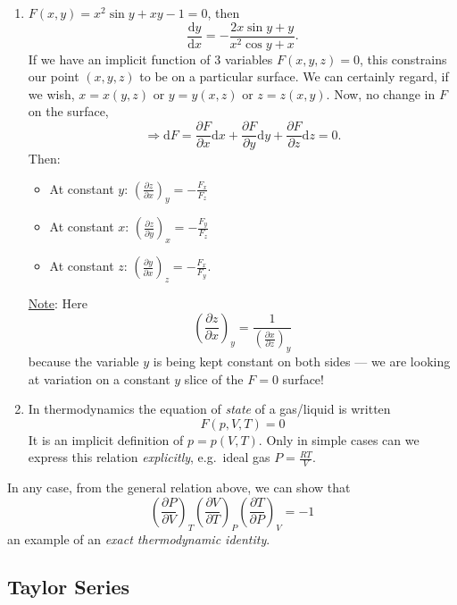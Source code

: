 \documentclass[12pt]{report}
\theoremstyle{definition}
\begin{document}
\begin{enumerate}[label = (\roman*)]
    \item $F(x,y) = x^{2}\sin{y} + xy - 1 = 0$, then\[
            \frac{\mathrm{d}y}{\mathrm{d}x} = -\frac{2x\sin{y}+y}{x^{2}\cos{y}+x}.
    \]
    If we have an implicit function of 3 variables $F(x,y,z) = 0$, 
    this constrains our point $(x,y,z)$ to be on a particular surface.
    We can certainly regard, if we wish, $x= x(y,z)$ or $y = y(x,z)$ or $z = z(x,y)$.
    Now, no change in $F$ on the surface,\[
        \Rightarrow{}\mathrm{d}F = \frac{\partial F}{\partial x} \mathrm{d}x
        + \frac{\partial F}{\partial y} \mathrm{d}y + \frac{\partial F}{\partial z} \mathrm{d}z = 0.
    \]
    Then:
    \begin{itemize}
        \item At constant $y$: ${\left(\frac{\partial z}{\partial x} \right)}_{y}=-\frac{F_x}{F_z}$
        \item At constant $x$: ${\left(\frac{\partial z}{\partial y} \right)}_{x}=-\frac{F_y}{F_z}$
        \item At constant $z$: ${\left(\frac{\partial y}{\partial x} \right)}_{z}=-\frac{F_x}{F_y}$.
    \end{itemize}

    \underline{Note}: Here\[
        {\left(\frac{\partial z}{\partial x} \right)}_{y} 
        = \frac{1}{{\left(\frac{\partial x}{\partial z} \right)}_{y}}
    \]because the variable $y$ is being kept constant on both sides ---
    we are looking at variation on a constant $y$ slice of the $F=0$ surface!

\item In thermodynamics the equation of \emph{state} of a gas/liquid is written\[
        F(p,V,T) = 0
    \]It is an implicit definition of $p = p(V,T)$.
    Only in simple cases can we express this relation \emph{explicitly},
    e.g.\ ideal gas $P = \frac{RT}{V}$.
\end{enumerate}

\noindent In any case, from the general relation above, we can show that\[
    {\left(\frac{\partial P}{\partial V} \right)}_{T}
    {\left(\frac{\partial V}{\partial T} \right)}_{P}
    {\left(\frac{\partial T}{\partial P} \right)}_{V} = -1
\]an example of an \emph{exact thermodynamic identity}.

\subsection{Taylor Series}
\end{document}
